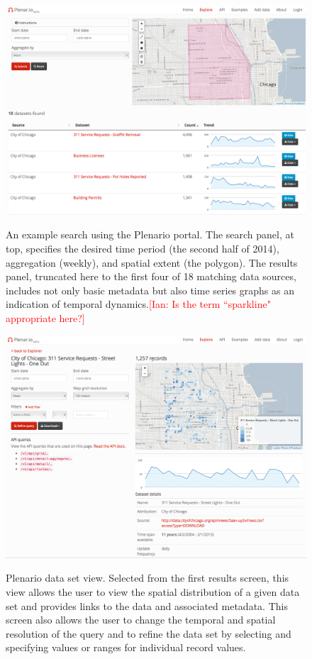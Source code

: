\documentclass[11pt]{article}
\newcommand{\ian}[1]{\textcolor{Red}{[Ian: #1]}}
\newcommand{\ian}[1]{}
\begin{document}
\begin{figure}
	\centering
	\includegraphics[scale=.25]{plenario_search_example.png}
	\label{fig:plenario-search-example}
	\caption{An example search using the Plenario portal. The search panel, at top, specifies the desired time period (the second half of 2014), aggregation (weekly), and spatial extent (the polygon). The results panel, truncated here to the first four of 18 matching data sources, includes not only basic metadata but also time series graphs as an indication of temporal dynamics.\ian{Is the term ``sparkline" appropriate here?}\vspace{.4cm}}
\end{figure}

\begin{figure}
	\centering
	\includegraphics[scale=.25]{plenario_dataset_view.png}
	\label{fig:plenario-dataset-view}
	\caption{Plenario data set view. Selected from the first results screen, this view allows the user to view the spatial distribution of a given data set and provides links to the data and associated metadata. This screen also allows the user to change the temporal and spatial resolution of the query and to refine the data set by selecting and specifying values or ranges for individual record values.\vspace{.4cm}}
\end{figure}
\end{document}
